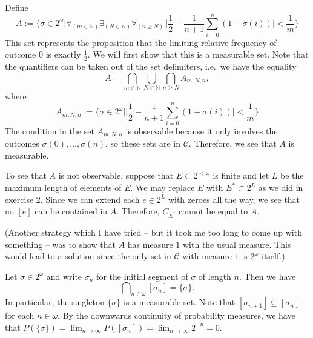 \documentclass{article}
\begin{document}
\begin{ex}
Define
\begin{equation*}
A:=\Big\{\sigma\in 2^\omega\mathbin{\Big|}
      \forall_{(m\in\mathbb{N})}\exists_{(N\in\mathbb{N})}\forall_{(n\geq N)}\,\big|\frac{1}{2}-\frac{1}{n+1}\sum_{i=0}^n(1-\sigma(i))\big|<\frac{1}{m}\Big\}
\end{equation*}
This set represents the proposition that the limiting relative frequency of outcome $0$ is exactly $\frac{1}{2}$. We will first show that this is a measurable set. Note that the quantifiers can be taken out of the set delimiters, i.e.~we have the equality
\begin{equation*}
A=\bigcap_{m\in\mathbb{N}}\bigcup_{N\in\mathbb{N}}\bigcap_{n\geq N} A_{m,N,n},
\end{equation*}
where
\begin{equation*}
A_{m,N,n}:=\Big\{\sigma\in 2^\omega\mathbin{\Big|}\big|\frac{1}{2}-\frac{1}{n+1}\sum_{i=0}^n(1-\sigma(i))\big|<\frac{1}{m}\Big\}
\end{equation*}
The condition in the set $A_{m,N,n}$ is observable because it only involves the outcomes $\sigma(0),\ldots,\sigma(n)$, so these sets are in $\mathcal{C}$. Therefore, we see that $A$ is measurable. 

To see that $A$ is not observable, suppose that $E\subset 2^{<\omega}$ is finite and let $L$ be the maximum length of elements of $E$. We may replace $E$ with $E^\ast\subset 2^L$ as we did in exercise 2. Since we can extend each $e\in 2^L$ with zeroes all the way, we see that no $[e]$ can be contained in $A$. Therefore, $C_{E^\ast}$ cannot be equal to $A$.

(Another strategy which I have tried -- but it took me too long to come up with something -- was to show that $A$ has measure $1$ with the usual measure. This would lead to a solution since the only set in $\mathcal{C}$ with measure $1$ is $2^\omega$ itself.)
\end{ex}

\begin{ex}
Let $\sigma\in 2^\omega$ and write $\sigma_n$ for the initial segment of $\sigma$ of length $n$. Then we have
\begin{equation*}
\bigcap\nolimits_{n\in\omega}[\sigma_n]=\{\sigma\}.
\end{equation*}
In particular, the singleton $\{\sigma\}$ is a measurable set. Note that $[\sigma_{n+1}]\subseteq[\sigma_n]$ for each $n\in\omega$. By the downwards continuity of probability measures, we have that $P(\{\sigma\})=\lim_{n\to\infty}P([\sigma_n])=\lim_{n\to\infty}2^{-n}=0$. 
\end{ex}
\end{document}
